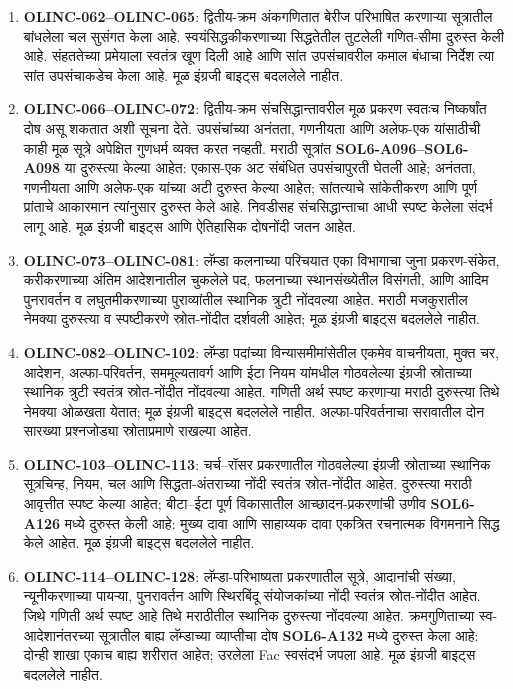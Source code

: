 \begin{enumerate}
\item \textbf{OLINC-062--OLINC-065}: द्वितीय-क्रम अंकगणितात
बेरीज परिभाषित करणाऱ्या सूत्रातील बांधलेला चल सुसंगत केला आहे.
स्वयंसिद्धकीकरणाच्या सिद्धतेतील तुटलेली गणित-सीमा दुरुस्त केली आहे.
संहततेच्या प्रमेयाला स्वतंत्र खूण दिली आहे आणि सांत उपसंचावरील
कमाल बंधाचा निर्देश त्या सांत उपसंचाकडेच केला आहे.
मूळ इंग्रजी बाइट्स बदललेले नाहीत.

\item \textbf{OLINC-066--OLINC-072}: द्वितीय-क्रम
संचसिद्धान्तावरील मूळ प्रकरण स्वतःच निष्कर्षांत दोष
असू शकतात अशी सूचना देते. उपसंचांच्या अनंतता,
गणनीयता आणि अलेफ-एक यांसाठीची काही मूळ सूत्रे
अपेक्षित गुणधर्म व्यक्त करत नव्हती. मराठी सूत्रांत
\textbf{SOL6-A096--SOL6-A098} या दुरुस्त्या केल्या आहेत:
एकास-एक अट संबंधित उपसंचापुरती घेतली आहे; अनंतता,
गणनीयता आणि अलेफ-एक यांच्या अटी दुरुस्त केल्या आहेत;
सांतत्याचे सांकेतीकरण आणि पूर्ण प्रांताचे आकारमान
त्यांनुसार दुरुस्त केले आहे. निवडीसह संचसिद्धान्ताचा
आधी स्पष्ट केलेला संदर्भ लागू आहे. मूळ इंग्रजी बाइट्स
आणि ऐतिहासिक दोषनोंदी जतन आहेत.

\item \textbf{OLINC-073--OLINC-081}: लॅम्डा कलनाच्या
परिचयात एका विभागाचा जुना प्रकरण-संकेत, करीकरणाच्या
अंतिम आदेशनातील चुकलेले पद, फलनाच्या स्थानसंख्येतील
विसंगती, आणि आदिम पुनरावर्तन व लघुतमीकरणाच्या
पुराव्यांतील स्थानिक त्रुटी नोंदवल्या आहेत. मराठी
मजकुरातील नेमक्या दुरुस्त्या व स्पष्टीकरणे स्रोत-नोंदीत
दर्शवली आहेत; मूळ इंग्रजी बाइट्स बदललेले नाहीत.

\item \textbf{OLINC-082--OLINC-102}: लॅम्डा पदांच्या
विन्यासमीमांसेतील एकमेव वाचनीयता, मुक्त चर, आदेशन,
अल्फा-परिवर्तन, सममूल्यतावर्ग आणि ईटा नियम यांमधील
गोठवलेल्या इंग्रजी स्रोताच्या स्थानिक त्रुटी स्वतंत्र
स्रोत-नोंदीत नोंदवल्या आहेत. गणिती अर्थ स्पष्ट करणाऱ्या
मराठी दुरुस्त्या तिथे नेमक्या ओळखता येतात; मूळ इंग्रजी
बाइट्स बदललेले नाहीत. अल्फा-परिवर्तनाचा सरावातील
दोन सारख्या प्रश्नजोड्या स्रोताप्रमाणे राखल्या आहेत.

\item \textbf{OLINC-103--OLINC-113}: चर्च–रॉसर प्रकरणातील
गोठवलेल्या इंग्रजी स्रोताच्या स्थानिक सूत्रचिन्ह, नियम,
चल आणि सिद्धता-अंतराच्या नोंदी स्वतंत्र स्रोत-नोंदीत
आहेत. दुरुस्त्या मराठी आवृत्तीत स्पष्ट केल्या आहेत;
बीटा–ईटा पूर्ण विकासातील आच्छादन-प्रकरणांची उणीव
\textbf{SOL6-A126} मध्ये दुरुस्त केली आहे: मुख्य
दावा आणि साहाय्यक दावा एकत्रित रचनात्मक विगमनाने
सिद्ध केले आहेत. मूळ इंग्रजी बाइट्स
बदललेले नाहीत.

\item \textbf{OLINC-114--OLINC-128}: लॅम्डा-परिभाष्यता
प्रकरणातील सूत्रे, आदानांची संख्या, न्यूनीकरणाच्या पायऱ्या,
पुनरावर्तन आणि स्थिरबिंदू संयोजकांच्या नोंदी स्वतंत्र
स्रोत-नोंदीत आहेत. जिथे गणिती अर्थ स्पष्ट आहे तिथे
मराठीतील स्थानिक दुरुस्त्या नोंदवल्या आहेत.
क्रमगुणिताच्या स्व-आदेशानंतरच्या सूत्रातील बाह्य
लॅम्डाच्या व्याप्तीचा दोष \textbf{SOL6-A132} मध्ये
दुरुस्त केला आहे: दोन्ही शाखा एकाच बाह्य शरीरात
आहेत; उरलेला Fac स्वसंदर्भ जपला आहे.
मूळ इंग्रजी बाइट्स बदललेले नाहीत.


\end{enumerate}
